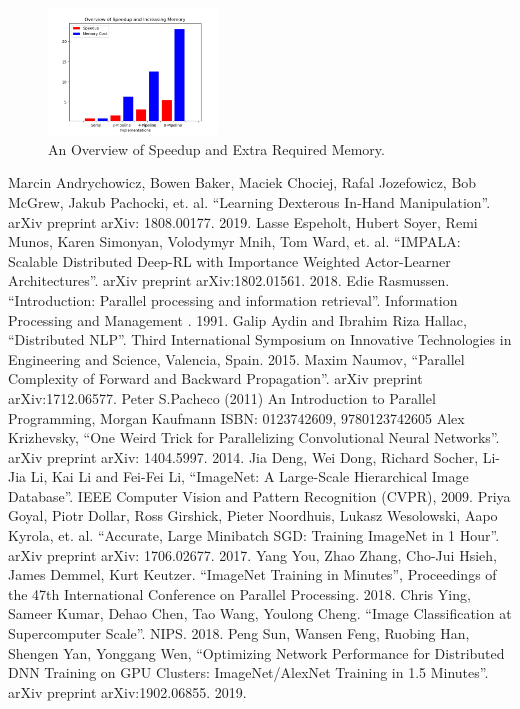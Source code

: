 \documentclass[conference]{IEEEtran}
\begin{document}
\begin{figure}[htbp]
\centerline{\includegraphics[width=0.4\textwidth]{result.png}}
\caption{An Overview of Speedup and Extra Required Memory.}
\label{fig_hyper}
\end{figure}

\begin{thebibliography}{00}
 Marcin Andrychowicz, Bowen Baker, Maciek Chociej, Rafal Jozefowicz, Bob McGrew, Jakub Pachocki, et. al. “Learning Dexterous In-Hand Manipulation”. arXiv preprint arXiv: 1808.00177. 2019.
 Lasse Espeholt, Hubert Soyer, Remi Munos, Karen Simonyan, Volodymyr Mnih, Tom Ward, et. al. “IMPALA: Scalable Distributed Deep-RL with Importance Weighted Actor-Learner Architectures”. arXiv preprint arXiv:1802.01561. 2018.
 Edie Rasmussen. “Introduction: Parallel processing and information retrieval”. Information Processing and Management . 1991.
 Galip Aydin and Ibrahim Riza Hallac, “Distributed NLP”. Third International Symposium on Innovative Technologies in Engineering and Science, Valencia, Spain. 2015.
 Maxim Naumov, “Parallel Complexity of Forward and Backward Propagation”. arXiv preprint arXiv:1712.06577.
 Peter S.Pacheco (2011) An Introduction to Parallel Programming, Morgan Kaufmann ISBN: 0123742609, 9780123742605
 Alex Krizhevsky, “One Weird Trick for Parallelizing Convolutional Neural Networks”. arXiv preprint arXiv: 1404.5997. 2014.
 Jia Deng, Wei Dong, Richard Socher, Li-Jia Li, Kai Li and Fei-Fei Li, “ImageNet: A Large-Scale Hierarchical Image Database”. IEEE Computer Vision and Pattern Recognition (CVPR), 2009.
 Priya Goyal, Piotr Dollar, Ross Girshick, Pieter Noordhuis, Lukasz Wesolowski, Aapo Kyrola, et. al. “Accurate, Large Minibatch SGD: Training ImageNet in 1 Hour”. arXiv preprint arXiv: 1706.02677. 2017.
 Yang You, Zhao Zhang, Cho-Jui Hsieh, James Demmel, Kurt Keutzer. “ImageNet Training in Minutes”, Proceedings of the 47th International Conference on Parallel Processing. 2018.
 Chris Ying, Sameer Kumar, Dehao Chen, Tao Wang, Youlong Cheng. “Image Classification at Supercomputer Scale”. NIPS. 2018.
 Peng Sun, Wansen Feng, Ruobing Han, Shengen Yan, Yonggang Wen, “Optimizing Network Performance for Distributed DNN Training on GPU Clusters: ImageNet/AlexNet Training in 1.5 Minutes”. arXiv preprint arXiv:1902.06855. 2019.
\end{thebibliography}

\vspace{12pt}
\end{document}
